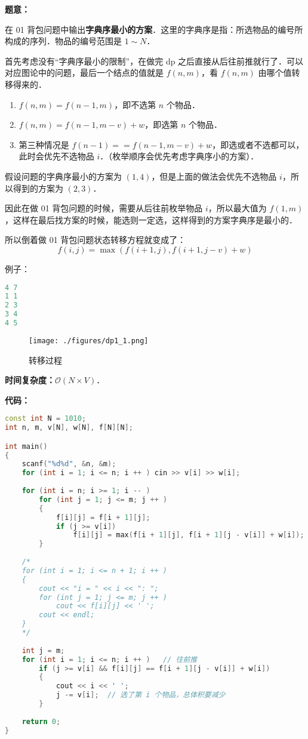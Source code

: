 \textbf{题意：}

在 01 背包问题中输出\textbf{字典序最小的方案}．这里的字典序是指：所选物品的编号所构成的序列．物品的编号范围是 $1 \sim N$．

首先考虑没有“字典序最小的限制”，在做完 dp 之后直接从后往前推就行了．可以对应图论中的问题，最后一个结点的值就是 $f(n, m)$，看 $f(n, m)$ 由哪个值转移得来的．

\begin{enumerate}
\item $f(n, m) = f(n - 1, m)$，即不选第 $n$ 个物品．
\item $f(n, m) = f(n - 1, m - v) + w$，即选第 $n$ 个物品．
\item 第三种情况是 $f(n - 1) == f(n - 1, m - v) + w$，即选或者不选都可以，此时会优先不选物品 $i$．（枚举顺序会优先考虑字典序小的方案）．
\end{enumerate}

假设问题的字典序最小的方案为 $(1, 4)$，但是上面的做法会优先不选物品 $i$，所以得到的方案为 $(2, 3)$．

因此在做 01 背包问题的时候，需要从后往前枚举物品 $i$，所以最大值为  $f(1, m)$，这样在最后找方案的时候，能选则一定选，这样得到的方案字典序是最小的．

所以倒着做 01 背包问题状态转移方程就变成了：
\begin{equation}
f(i, j) = \max(f(i + 1, j), f(i + 1, j - v) + w)
\end{equation}

例子：

\begin{lstlisting}[language=cpp]
4 7
1 1 
2 3 
3 4
4 5
\end{lstlisting}

\begin{figure}[ht]
\centering
\texttt{[image: ./figures/dp1\_1.png]}
\caption{转移过程} \label{dp1_fig1}
\end{figure}

\textbf{时间复杂度：}$\mathcal{O}(N \times V)$．

\textbf{代码：}

\begin{lstlisting}[language=cpp]
const int N = 1010;
int n, m, v[N], w[N], f[N][N];

int main()
{
    scanf("%d%d", &n, &m);
    for (int i = 1; i <= n; i ++ ) cin >> v[i] >> w[i];
    
    for (int i = n; i >= 1; i -- )
        for (int j = 1; j <= m; j ++ )
        {
            f[i][j] = f[i + 1][j];
            if (j >= v[i])
            	f[i][j] = max(f[i + 1][j], f[i + 1][j - v[i]] + w[i]);
        }
      
    /* 
    for (int i = 1; i <= n + 1; i ++ )
    {
        cout << "i = " << i << ": ";
        for (int j = 1; j <= m; j ++ )
            cout << f[i][j] << ' ';
        cout << endl;
    }
    */
    
    int j = m;
    for (int i = 1; i <= n; i ++ )   // 往前推
        if (j >= v[i] && f[i][j] == f[i + 1][j - v[i]] + w[i])
        {
            cout << i << ' ';
            j -= v[i];  // 选了第 i 个物品，总体积要减少
        }
    
    return 0;
}
\end{lstlisting}

